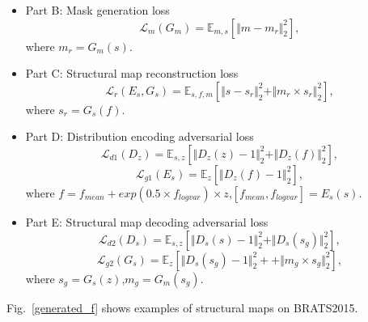 \documentclass[runningheads]{llncs}
\begin{document}
	\begin{itemize}
		\item{Part B: Mask generation loss}
		\begin{equation}
		\mathcal{L}_{m}(G_m)=\mathbb{E}_{m,s}[\Vert{m-m_r}\Vert_{2}^{2}],
		\end{equation}
		where $m_r=G_m(s)$.
		\item{Part C: Structural map reconstruction loss} 
		\begin{equation}
		\mathcal{L}_{r}(E_s,G_s)=\mathbb{E}_{s,f,m}[\Vert{s-s_r}\Vert_{2}^{2}+\Vert{m_r\times s_r}\Vert_{2}^{2}],
		\end{equation}
		where $s_r=G_s(f)$.
		\item{Part D: Distribution encoding adversarial loss} 
		\begin{equation}
		\mathcal{L}_{d1}(D_{z})=\mathbb{E}_{s,z}[\Vert{D_{z}(z)-1}\Vert_{2}^{2}+\Vert{D_{z}(f)}\Vert_{2}^{2}],
		\end{equation}
		\begin{equation}
		\mathcal{L}_{g1}(E_s)=\mathbb{E}_{z}[\Vert{D_{z}(f)-1}\Vert_{2}^{2}],	
		\end{equation}
		where $f=f_{mean}+exp(0.5\times f_{logvar})\times z$,$[f_{mean},f_{logvar}]=E_s(s)$.
		\item{Part E: Structural map decoding adversarial loss} 
		\begin{equation}
		\mathcal{L}_{d2}(D_{s})=\mathbb{E}_{s,z}[\Vert{D_{s}(s)-1}\Vert_{2}^{2}+\Vert{D_{s}(s_g)}\Vert_{2}^{2}],
		\end{equation}
		\begin{equation}
		\mathcal{L}_{g2}(G_s)=\mathbb{E}_{z}[\Vert{D_{s}(s_g)-1}\Vert_{2}^{2}++\Vert{m_g\times s_g}\Vert_{2}^{2}],	
		\end{equation}
		where $s_g=G_s(z)$,$m_g=G_m(s_g)$.
	\end{itemize}
	Fig.~\ref{generated_f} shows examples of structural maps on BRATS2015.
\end{document}

